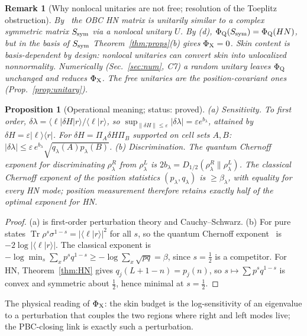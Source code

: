 \documentclass[11pt]{article}
\newtheorem{proposition}{Proposition}
\newtheorem{remark}{Remark}
\newcommand{\Tr}{\operatorname{Tr}}
\newcommand{\PhiQ}{\Phi_{\rm Q}}
\newcommand{\PhiX}{\Phi_{\rm X}}
\newcommand{\ip}[2]{\langle #1|#2\rangle}
\begin{document}
\begin{remark}[Why nonlocal unitaries are not free; resolution of the Toeplitz obstruction]
By~\cite{Chien} the OBC HN matrix is unitarily similar to a complex symmetric matrix $S_{\rm sym}$ via a \emph{nonlocal} unitary $U$. By (d), $\PhiQ(S_{\rm sym})=\PhiQ(HN)$, but in the basis of $S_{\rm sym}$ Theorem~\ref{thm:props}(b) gives $\PhiX=0$. Skin content is basis-dependent \emph{by design}: nonlocal unitaries can convert skin into unlocalized nonnormality. Numerically (Sec.~\ref{sec:num}, C7) a random unitary leaves $\PhiQ$ unchanged and reduces $\PhiX$. The free unitaries are the position-covariant ones (Prop.~\ref{prop:unitary}).
\end{remark}

\begin{proposition}[Operational meaning; status: proved]\label{prop:oper}
(a) \emph{Sensitivity.} To first order, $\delta\lambda=\ip{\ell}{\delta H|r}/\ip\ell r$, so $\sup_{\|\delta H\|\le\varepsilon}|\delta\lambda|=\varepsilon e^{b_\lambda}$, attained by $\delta H=\varepsilon|\ell\rangle\langle r|$. For $\delta H=\Pi_A\delta H\Pi_B$ supported on cell sets $A,B$: $|\delta\lambda|\le\varepsilon\,e^{b_\lambda}\sqrt{q_\lambda(A)p_\lambda(B)}$.
(b) \emph{Discrimination.} The quantum Chernoff exponent for discriminating $\rho^R_\lambda$ from $\rho^L_\lambda$ is $2b_\lambda=D_{1/2}(\rho^R_\lambda\|\rho^L_\lambda)$. The classical Chernoff exponent of the position statistics $(p_\lambda,q_\lambda)$ is $\ge\beta_\lambda$, with equality for every HN mode; position measurement therefore retains exactly half of the optimal exponent for HN.
\end{proposition}
\begin{proof}
(a) is first-order perturbation theory and Cauchy--Schwarz. (b) For pure states $\Tr\rho^s\sigma^{1-s}=|\ip{\ell}{r}|^2$ for all $s$, so the quantum Chernoff exponent~\cite{Audenaert} is $-2\log|\ip\ell r|$. The classical exponent is $-\log\min_s\sum_xp^sq^{1-s}\ge-\log\sum_x\sqrt{pq}=\beta$, since $s=\tfrac12$ is a competitor. For HN, Theorem~\ref{thm:HN} gives $q_j(L+1-n)=p_j(n)$, so $s\mapsto\sum p^sq^{1-s}$ is convex and symmetric about $\tfrac12$, hence minimal at $s=\tfrac12$.
\end{proof}
The physical reading of $\PhiX$: the skin budget is the log-sensitivity of an eigenvalue to a perturbation that couples the two regions where right and left modes live; the PBC-closing link is exactly such a perturbation.

\end{document}
